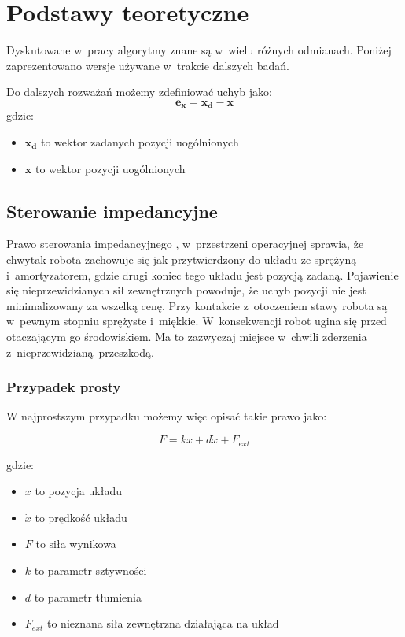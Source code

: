 
\chapter{Podstawy teoretyczne\label{chap:przeglad_literatury}}
Dyskutowane w~pracy algorytmy znane są w~wielu różnych odmianach. Poniżej zaprezentowano wersje używane w~trakcie dalszych badań. 

Do dalszych rozważań możemy zdefiniować uchyb jako:
\begin{equation}
	\boldsymbol{e_x} = \boldsymbol{x_d} - \boldsymbol{x}
\end{equation}
gdzie:
\begin{itemize}
\item $\boldsymbol{x_d}$ to wektor zadanych pozycji uogólnionych
\item $\boldsymbol{x}$ to wektor pozycji uogólnionych
\end{itemize}

\section{Sterowanie impedancyjne}
Prawo sterowania impedancyjnego \cite{bib:impedance}, \cite{wiki:Impedance_control} w~przestrzeni operacyjnej sprawia, że chwytak robota zachowuje się jak przytwierdzony do układu ze sprężyną i~amortyzatorem, gdzie drugi koniec tego układu jest pozycją zadaną. Pojawienie się nieprzewidzianych sił zewnętrznych powoduje, że uchyb pozycji nie jest minimalizowany za wszelką cenę. Przy kontakcie z~otoczeniem stawy robota są w~pewnym stopniu sprężyste i~miękkie. W~konsekwencji robot ugina się przed otaczającym go środowiskiem. Ma to zazwyczaj miejsce w~chwili zderzenia z~nieprzewidzianą przeszkodą. 

\subsection{Przypadek prosty}
W najprostszym przypadku możemy więc opisać takie prawo jako: 

	\begin{equation}
	F = kx + d\dot{x} + F_{ext}
	\end{equation}

gdzie:
\begin{itemize}
\item $x$ to pozycja układu
\item $\dot{x}$ to prędkość układu
\item $F$ to siła wynikowa
\item $k$ to parametr sztywności
\item $d$ to parametr tłumienia
\item $F_{ext}$ to nieznana siła zewnętrzna działająca na układ
\end{itemize} 

